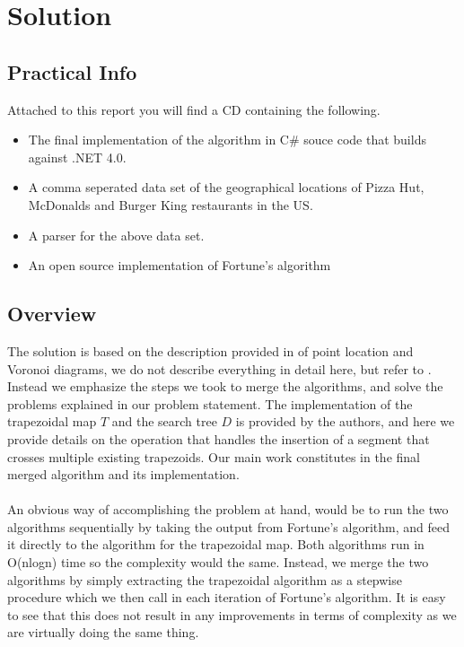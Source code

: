 \section{Solution}
\subsection{Practical Info}
Attached to this report you will find a CD containing the following.
\begin{itemize}
  \item The final implementation of the algorithm in C\# souce code that builds against .NET 4.0.
  \item A comma seperated data set of the geographical locations of Pizza Hut, McDonalds and Burger King restaurants in the US.
  \item A parser for the above data set.
  \item An open source implementation of Fortune's algorithm \cite{fortunes}
\end{itemize}

\subsection{Overview}
The solution is based on the description provided in \cite{computational_geometry} of point location and Voronoi diagrams, we do not describe everything in detail here, but refer to \cite{computational_geometry}. Instead we emphasize the steps we took to merge the algorithms, and solve the problems explained in our problem statement. The implementation of the trapezoidal map $T$ and the search tree $D$ is provided by the authors, and here we provide details on the operation that handles the insertion of a segment that crosses multiple existing trapezoids. Our main work constitutes in the final merged algorithm and its implementation.
\paragraph{}
An obvious way of accomplishing the problem at hand, would be to run the two algorithms sequentially by taking the output from Fortune's algorithm, and feed it directly to the algorithm for the trapezoidal map. Both algorithms run in O(nlogn)  time so the complexity would the same. Instead, we merge the two algorithms by simply extracting the trapezoidal algorithm as a stepwise procedure which we then call in each iteration of Fortune's algorithm. It is easy to see that this does not result in any improvements in terms of complexity as we are virtually doing the same thing.  

